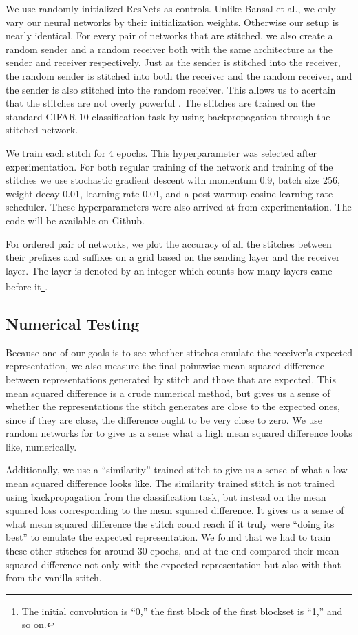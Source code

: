 \documentclass{article} %
\begin{document}
We use randomly initialized ResNets as controls. Unlike Bansal et al., we only vary our neural networks by their
initialization weights. Otherwise our setup is nearly identical.
For every pair of networks that are stitched, we also create a random sender and a random
receiver both with the same architecture as the sender and receiver respectively. Just as the sender is stitched
into the receiver, the random sender is stitched into both the receiver and the random receiver, and the sender
is also stitched into the random receiver. This allows us to acertain that the stitches
are not overly powerful \cite{Bansal2021RevisitingMS}. The stitches are trained on
the standard CIFAR-10 classification task by using backpropagation through the stitched network.

We train each stitch for 4 epochs. This hyperparameter was selected after experimentation. For both
regular training of the network and training of the stitches we use stochastic gradient descent with momentum 0.9,
batch size 256, weight decay 0.01, learning rate 0.01, and a post-warmup cosine learning rate scheduler.
These hyperparameters were also arrived at from experimentation. The code will be available on Github.

For ordered pair of networks, we plot the accuracy of all the stitches between their prefixes and suffixes
on a grid based on the sending layer and the receiver layer. The layer is
denoted by an integer which counts how many layers came before it\footnote{
   The initial convolution is ``0,'' the first block of the first blockset is ``1,'' and so on.
}.

\subsection*{Numerical Testing}
Because one of our goals is to see whether stitches emulate the receiver's expected representation, we
also measure the final pointwise mean squared difference between representations generated by stitch and
those that are expected. This mean squared difference is a crude numerical method, 
but gives us a sense of whether the representations
the stitch generates are close to the expected ones, since if they are close, the difference ought to be very close
to zero. We use random networks for to give us a sense what a high mean squared difference
looks like, numerically.

Additionally, we use a ``similarity'' trained stitch to give us a sense of what a low mean
squared difference looks like. The similarity trained stitch is not trained using backpropagation
from the classification task, but instead on the mean squared loss corresponding to the mean squared difference.
It gives us a sense of what mean squared difference the stitch could reach if it truly were ``doing its best''
to emulate the expected representation. We found that we had to train these other stitches for around 30 epochs, and
at the end compared their mean squared difference not only with the expected representation but also with that
from the vanilla stitch.
\end{document}

